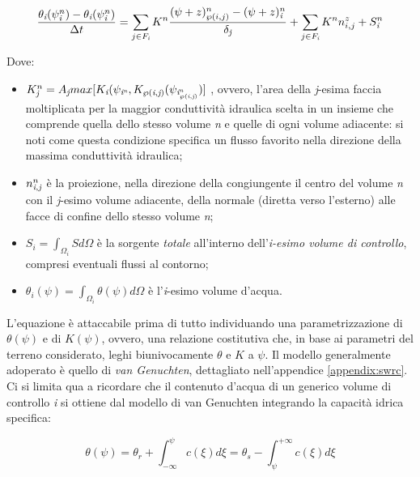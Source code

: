 \documentclass[11pt]{amsart}
\theoremstyle{definition}
\theoremstyle{remark}
\numberwithin{equation}{section}
\begin{document}
\begin{equation}
\label{eq:richards_first}
\frac{\theta_{\emph{i}}(\psi_{\emph{i}}^{n}) - \theta_{\emph{i}}(\psi_{\emph{i}}^{n})}{\Delta t} = \sum_{j \in F_{\emph{i}}}K_{\emph{}}^{n}\frac{(\psi + z)_{\wp(i,j)}^{n}-(\psi + z)^{n}_{\emph{i}}}{\delta_{\emph{j}}}+\sum_{j \in F_{\emph{i}}}K_{\emph{}}^{n}n_{i,j}^{z}+S_{\emph{i}}^{n}
\end{equation}

Dove:
\begin{itemize}
  \item $ K_{\emph{j}}^{n} = A_{\emph{j}}max[K_{\emph{i}}(\psi_{\emph{i}^{\emph{n}}},K_{\wp(\emph{i},\emph{j})}(\psi_{\emph{i}^{\emph{n}}_{\wp(\emph{i},\emph{j})}})] $ , ovvero, l'area della \emph{j}-esima faccia moltiplicata per la maggior conduttività idraulica scelta in un insieme che comprende quella dello stesso volume \emph{n} e quelle di ogni volume adiacente: si noti come questa condizione specifica un flusso favorito nella direzione della massima conduttività idraulica;
  \item $ n_{\emph{i},\emph{j}}^{n} $ è la proiezione, nella direzione della congiungente il centro del volume \emph{n} con il \emph{j}-esimo volume adiacente, della normale (diretta verso l'esterno) alle facce di confine dello stesso volume \emph{n};
  \item $ S_i = \int_{\Omega_{i}}Sd\Omega$ è la sorgente \emph{totale} all'interno dell'\emph{i-esimo volume di controllo}, compresi eventuali flussi al contorno;
  \item $ \theta_{i}(\psi) = \int_{\Omega_{i}}\theta(\psi)d\Omega$ è l'\emph{i}-esimo volume d'acqua.
\end{itemize}


L'equazione è attaccabile prima di tutto individuando una parametrizzazione di $\theta(\psi)$ e di $K(\psi)$, ovvero, una relazione costitutiva che, in base ai parametri del terreno considerato, leghi biunivocamente $\theta$ e $K$ a $\psi$. Il modello generalmente adoperato è quello di \emph{van Genuchten}, dettagliato nell'appendice \ref{appendix:swrc}. Ci si limita qua a ricordare che il contenuto d'acqua di un generico volume di controllo \emph{i} si ottiene dal modello di van Genuchten integrando la capacità idrica specifica:

\begin{equation}
\theta(\psi) = \theta_{r} + \int_{-\infty}^{\psi}c(\xi)d\xi = \theta_{s} - \int_{\psi}^{+\infty}c(\xi)d\xi
\end{equation} 
\end{document}

